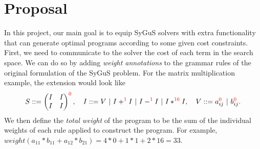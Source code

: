\section{Proposal}
\label{sec:proposal}
%
In this project, our main goal is to equip SyGuS solvers with extra functionality that can generate optimal programs according to some given cost constraints.
%
First, we need to communicate to the solver the cost of each term in the search space.
%
We can do so by adding \emph{weight annotations} to the grammar rules of the original formulation of the SyGuS problem.
%
For the matrix multiplication example, the extension would look like
%
\[
    S ::=
    \begin{pmatrix} I & I \\
        I & I
    \end{pmatrix}^{\color{red}0\color{black}}, \quad
    I ::= V \ | \ I +^{\color{red}1\color{black}} I \ | \ I -^{\color{red}1\color{black}} I \ | \ I *^{\color{red}16\color{black}} I, \quad
V ::= a_{ij}^{\color{red}0\color{black}} \ | \ b_{ij}^{\color{red}0\color{black}}.
\]
%
We then define the \emph{total weight} of the program to be the sum of the individual weights of each rule applied to construct the program. For example, $weight(a_{11} * b_{11} + a_{12} * b_{21}) = 4*0 + 1*1 + 2* 16 = 33$.
%

